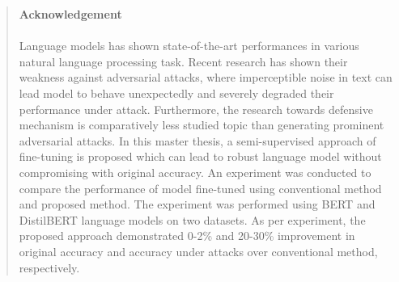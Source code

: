 
\pagestyle{plain}


\begin{quote}
	\textbf{\Large Acknowledgement}\\\\
Language models has shown state-of-the-art performances in various natural language  processing task. Recent research has shown their weakness against adversarial attacks, where imperceptible noise in text can lead model to behave unexpectedly and severely degraded their performance under attack. Furthermore, the research towards defensive mechanism is comparatively less studied topic than generating prominent adversarial attacks. In this master thesis, a semi-supervised approach of fine-tuning is proposed which can lead to robust language model without compromising with original accuracy. An experiment was conducted to compare the performance of model fine-tuned using conventional method and proposed method. The experiment was performed using BERT and DistilBERT language models on two datasets.  As per experiment, the proposed approach demonstrated 0-2\% and  20-30\%  improvement in original accuracy and  accuracy under attacks over conventional method, respectively.

\end{quote}
